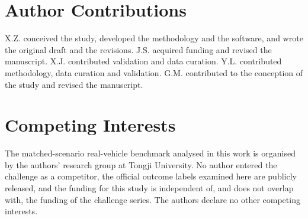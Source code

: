 \documentclass[12pt,a4paper]{article}
\begin{document}
\section*{Author Contributions}
X.Z. conceived the study, developed the methodology and the software, and wrote the original draft
and the revisions. J.S. acquired funding and revised the manuscript. X.J. contributed validation and
data curation. Y.L. contributed methodology, data curation and validation. G.M. contributed to the
conception of the study and revised the manuscript.

\section*{Competing Interests}
The matched-scenario real-vehicle benchmark analysed in this work is organised by the authors'
research group at Tongji University. No author entered the challenge as a competitor, the official
outcome labels examined here are publicly released, and the funding for this study is independent of,
and does not overlap with, the funding of the challenge series. The authors declare no other
competing interests.
\end{document}
